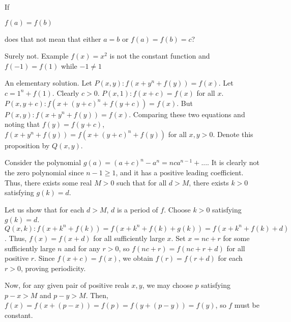 \begin{solution}
	\begin{tcolorbox}If

$f(a)=f(b)$

does that not mean that either $ a=b$
or $f(a)=f(b)=c$?\end{tcolorbox}
Surely not. Example $f(x)=x^2$ is not the constant function and $f(-1)=f(1)$ while $-1\ne 1$
\end{solution}



\begin{solution}
	An elementary solution.
Let $P(x,y): f(x+y^n+f(y))=f(x)$.
Let $c=1^n+f(1)$. Clearly $c>0$.
$P(x,1): f(x+c)=f(x)$ for all $x$.
$P(x,y+c): f(x+(y+c)^n+f(y+c))=f(x)$.
But $P(x,y): f(x+y^n+f(y))=f(x)$. Comparing these two equations and noting that $f(y)=f(y+c)$,
$f(x+y^n+f(y))=f(x+(y+c)^n+f(y))$ for all $x,y>0$. Denote this proposition by $Q(x,y)$.

Consider the polynomial $g(a)=(a+c)^n-a^n=nca^{n-1}+...$.
It is clearly not the zero polynomial since $n-1 \geq 1$, and it has a positive leading coefficient.
Thus, there exists some real $M>0$ such that for all $d>M$, there exists $k>0$ satisfying $g(k)=d$.

Let us show that for each $d>M$, $d$ is a period of $f$.
Choose $k>0$ satisfying $g(k)=d$.
$Q(x,k): f(x+k^n+f(k))=f(x+k^n+f(k)+g(k))=f(x+k^n+f(k)+d)$.
Thus, $f(x)=f(x+d)$ for all sufficiently large $x$.
Set $x=nc+r$ for some sufficiently large $n$ and for any $r>0$, so $f(nc+r)=f(nc+r+d)$ for all positive $r$.
Since $f(x+c)=f(x)$, we obtain $f(r)=f(r+d)$ for each $r>0$, proving periodicity.

Now, for any given pair of positive reals $x,y$, we may choose $p$ satisfying $p-x>M$ and $p-y>M$.
Then, $f(x)=f(x+(p-x))=f(p)=f(y+(p-y))=f(y)$, so $f$ must be constant.
\end{solution}



